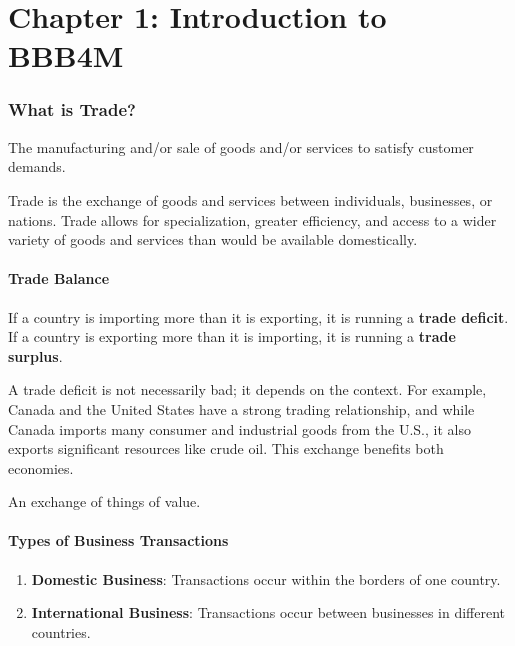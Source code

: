
\part{Chapter 1: Introduction to BBB4M}

\section{What is Trade?}%

\begin{definition}[Business]
   The manufacturing and/or sale of goods and/or services
   to satisfy customer demands.
\end{definition}

Trade is the exchange of goods and services between individuals, businesses, 
or nations. Trade allows for specialization, greater efficiency, and access 
to a wider variety of goods and services than would be available domestically.

\subsection{Trade Balance}
If a country is importing more than it is exporting, it is running a 
\textbf{trade deficit}. If a country is exporting more than it is importing, 
it is running a \textbf{trade surplus}.

A trade deficit is not necessarily bad; it depends on the context. 
For example, Canada and the United States have a strong trading relationship, 
and while Canada imports many consumer and industrial goods from the U.S., 
it also exports significant resources like crude oil. This exchange benefits both economies.

\begin{definition}[Transaction]
   An exchange of things of value.
\end{definition}

\subsection{Types of Business Transactions}
\begin{enumerate}
    \item \textbf{Domestic Business}: Transactions occur within the borders of one country.
    \item \textbf{International Business}: Transactions occur between businesses in different countries.
\end{enumerate}

